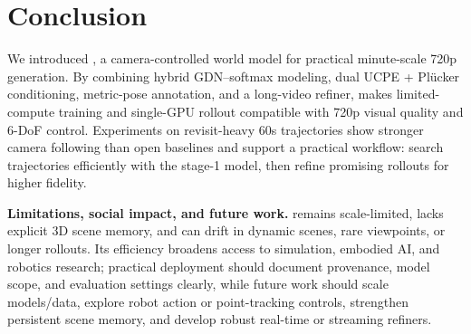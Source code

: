 \section{Conclusion}
\label{sec:conclusion}

We introduced \modelname, a camera-controlled world model for practical minute-scale 720p generation.
By combining hybrid GDN--softmax modeling, dual UCPE + Pl\"ucker conditioning, metric-pose annotation, and a long-video refiner, \modelname makes limited-compute training and single-GPU rollout compatible with 720p visual quality and 6-DoF control.
Experiments on revisit-heavy 60s trajectories show stronger camera following than open baselines and support a practical workflow: search trajectories efficiently with the stage-1 model, then refine promising rollouts for higher fidelity.

\noindent\textbf{Limitations, social impact, and future work.}
\modelname remains scale-limited, lacks explicit 3D scene memory, and can drift in dynamic scenes, rare viewpoints, or longer rollouts.
Its efficiency broadens access to simulation, embodied AI, and robotics research; practical deployment should document provenance, model scope, and evaluation settings clearly, while future work should scale models/data, explore robot action or point-tracking controls, strengthen persistent scene memory, and develop robust real-time or streaming refiners.
